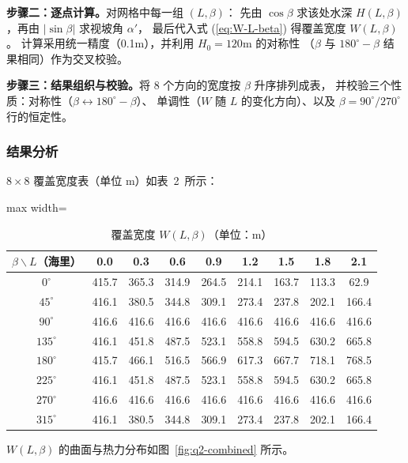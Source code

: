 \documentclass[withoutpreface,bwprint]{cumcmthesis} %
\begin{document}
\textbf{步骤二：逐点计算。}对网格中每一组 $(L,\beta)$：
先由 $\cos\beta$ 求该处水深 $H(L,\beta)$，再由 $|\sin\beta|$ 求视坡角 $\alpha'$，
最后代入式 (\ref{eq:W-L-beta}) 得覆盖宽度 $W(L,\beta)$。
计算采用统一精度（0.1m），并利用 $H_0=120$m 的对称性
（$\beta$ 与 $180^\circ-\beta$ 结果相同）作为交叉校验。

\textbf{步骤三：结果组织与校验。}将 8 个方向的宽度按 $\beta$ 升序排列成表，
并校验三个性质：对称性（$\beta\leftrightarrow180^\circ-\beta$）、
单调性（$W$ 随 $L$ 的变化方向）、以及 $\beta=90^\circ/270^\circ$ 行的恒定性。

\subsubsection{结果分析}

$8\times8$ 覆盖宽度表（单位 m）如表~2~所示：

\begin{table}[H]
\centering
\caption{覆盖宽度 $W(L,\beta)$（单位：m）}
\label{tab:q2}
\small
\begin{adjustbox}{max width=\textwidth}
\begin{tabular}{ccccccccc}
\toprule[1.5pt]
$\beta\backslash L$（海里） & 0.0 & 0.3 & 0.6 & 0.9 & 1.2 & 1.5 & 1.8 & 2.1 \\ \midrule[1pt]
$0^\circ$   & 415.7 & 365.3 & 314.9 & 264.5 & 214.1 & 163.7 & 113.3 & 62.9 \\
$45^\circ$  & 416.1 & 380.5 & 344.8 & 309.1 & 273.4 & 237.8 & 202.1 & 166.4 \\
$90^\circ$  & 416.6 & 416.6 & 416.6 & 416.6 & 416.6 & 416.6 & 416.6 & 416.6 \\
$135^\circ$ & 416.1 & 451.8 & 487.5 & 523.1 & 558.8 & 594.5 & 630.2 & 665.8 \\
$180^\circ$ & 415.7 & 466.1 & 516.5 & 566.9 & 617.3 & 667.7 & 718.1 & 768.5 \\
$225^\circ$ & 416.1 & 451.8 & 487.5 & 523.1 & 558.8 & 594.5 & 630.2 & 665.8 \\
$270^\circ$ & 416.6 & 416.6 & 416.6 & 416.6 & 416.6 & 416.6 & 416.6 & 416.6 \\
$315^\circ$ & 416.1 & 380.5 & 344.8 & 309.1 & 273.4 & 237.8 & 202.1 & 166.4 \\
\bottomrule[1.5pt]
\end{tabular}
\end{adjustbox}
\end{table}

$W(L,\beta)$ 的曲面与热力分布如图~\ref{fig:q2-combined} 所示。
\end{document}
